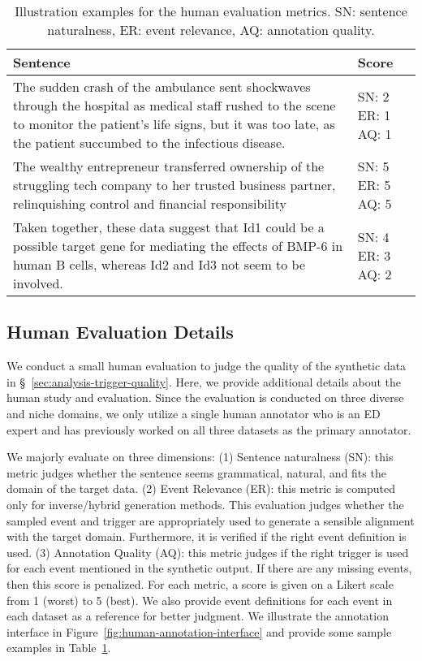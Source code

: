 \begin{table}[t]
    \centering
    \small
    \begin{tabular}{p{5cm}p{1cm}}
        \toprule
        \textbf{Sentence} & \textbf{Score} \\
        \midrule
        The sudden crash of the ambulance sent shockwaves through the hospital as medical staff rushed to the scene to monitor the patient's life signs, but it was too late, as the patient succumbed to the infectious disease. & SN: 2 ER: 1 AQ: 1 \\ \hline
        The wealthy entrepreneur transferred ownership of the struggling tech company to her trusted business partner, relinquishing control and financial responsibility & SN: 5 ER: 5 AQ: 5 \\ \hline
        Taken together, these data suggest that Id1 could be a possible target gene for mediating the effects of BMP-6 in human B cells, whereas Id2 and Id3 not seem to be involved. & SN: 4 ER: 3 AQ: 2\\
        \bottomrule
    \end{tabular}
    \caption{Illustration examples for the human evaluation metrics. SN: sentence naturalness, ER: event relevance, AQ: annotation quality.}
    \label{tab:human-annotation-examples}
\end{table}

\subsection{Human Evaluation Details}
\label{sec:appendix-human-study}

We conduct a small human evaluation to judge the quality of the synthetic data in \S~\ref{sec:analysis-trigger-quality}.
Here, we provide additional details about the human study and evaluation.
Since the evaluation is conducted on three diverse and niche domains, we only utilize a single human annotator who is an ED expert and has previously worked on all three datasets as the primary annotator.

We majorly evaluate on three dimensions:
(1) Sentence naturalness (SN): this metric judges whether the sentence seems grammatical, natural, and fits the domain of the target data.
(2) Event Relevance (ER): this metric is computed only for inverse/hybrid generation methods. This evaluation judges whether the sampled event and trigger are appropriately used to generate a sensible alignment with the target domain. Furthermore, it is verified if the right event definition is used.
(3) Annotation Quality (AQ): this metric judges if the right trigger is used for each event mentioned in the synthetic output. If there are any missing events, then this score is penalized.
For each metric, a score is given on a Likert scale \cite{likert1932technique} from 1 (worst) to 5 (best).
We also provide event definitions for each event in each dataset as a reference for better judgment.
We illustrate the annotation interface in Figure~\ref{fig:human-annotation-interface} and provide some sample examples in Table~\ref{tab:human-annotation-examples}.

